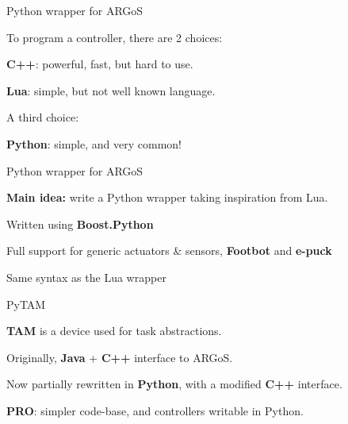 \documentclass[14pt, handout]{beamer}
\begin{document}
\begin{frame}{Python wrapper for ARGoS}
    \begin{fullpageitemize}
    \item<1->To program a controller, there are 2 choices:
    \begin{baseitemize}
        \item<2->[\rtarrow]\textbf{C++}: powerful, fast, but hard to use.
        \item<2->[\rtarrow]\textbf{Lua}: simple, but not well known language.
    \end{baseitemize}	
    \vspace{5mm}
    \item<3->A third choice:
    \begin{baseitemize}
        \item<3->[\rtarrow]\textbf{Python}: simple, and very common!
    \end{baseitemize}    
    \end{fullpageitemize}
\end{frame}

\begin{frame}{Python wrapper for ARGoS}
    \begin{fullpageitemize}
    \item<1->\textbf{Main idea:}	write a Python wrapper taking inspiration from Lua.
    \vspace{2mm}
    \begin{baseitemize}
    \item<2->[\rtarrow]Written using \textbf{Boost.Python}
    \vspace{2mm}
    \item<2->[\rtarrow]Full support for generic actuators \& sensors, \textbf{Footbot} and \textbf{e-puck}
    \vspace{2mm}
    \item<2->[\rtarrow]Same syntax as the Lua wrapper
\end{baseitemize}	

\end{fullpageitemize}
\end{frame}
\begin{frame}{PyTAM}
    \begin{fullpageitemize}
        \item<1->\textbf{TAM} is a device used for task abstractions.
        \item<2->Originally, \textbf{Java} + \textbf{C++} interface to ARGoS.
        \item<3->Now partially rewritten in \textbf{Python}, with a modified \textbf{C++} interface.
        \item<4->\textbf{PRO}: simpler code-base, and controllers writable in Python.
    \end{fullpageitemize}
\end{frame}    

\end{document}
